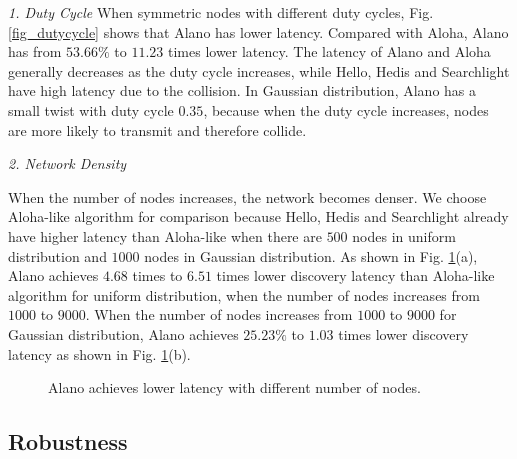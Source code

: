 \emph{1. Duty Cycle}
When symmetric nodes with different duty cycles, Fig. \ref{fig_dutycycle} shows that Alano has lower latency. Compared with Aloha, Alano has from $53.66\%$ to $11.23$ times lower latency. The latency of Alano and Aloha generally decreases as the duty cycle increases, while Hello, Hedis and Searchlight have high latency due to the collision. In Gaussian distribution, Alano has a small twist with duty cycle $0.35$, because when the duty cycle increases, nodes are more likely to transmit and therefore collide.


\emph{2. Network Density}

When the number of nodes increases, the network becomes denser. We choose Aloha-like algorithm for comparison because Hello, Hedis and Searchlight already have higher latency than Aloha-like when there are $500$ nodes in uniform distribution and $1000$ nodes in Gaussian distribution.
As shown in Fig. \ref{fig_node}(a), Alano achieves $4.68$ times to $6.51$ times lower discovery latency than Aloha-like algorithm for uniform distribution, when the number of nodes increases from $1000$ to $9000$.
When the number of nodes increases from $1000$ to $9000$ for Gaussian distribution, Alano achieves $25.23\%$ to $1.03$ times lower discovery latency as shown in Fig. \ref{fig_node}(b).  

\begin{figure}[!h]
\centering
{}
\hspace{0.01in}
\caption{Alano achieves lower latency with different number of nodes.}
\label{fig_node}
\end{figure}

\subsection{Robustness}

